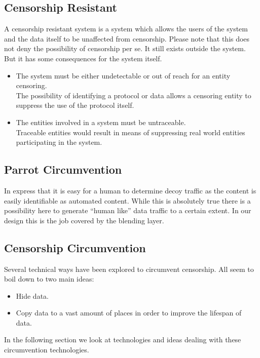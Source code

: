 \subsection{Censorship Resistant}
A censorship resistant system is a system which allows the users of the system and the data itself to be unaffected from censorship. Please note that this does not deny the possibility of censorship per se. It still exists outside the system. But it has some consequences for the system itself.

\begin{itemize}
	\item The system must be either undetectable or out of reach for an entity censoring.\\
	The possibility of identifying a protocol or data allows a censoring entity to suppress the use of the protocol itself. 
	\item The entities involved in a system must be untraceable.\\
	Traceable entities would result in means of suppressing real world entities participating in the system.
\end{itemize}

\subsection{Parrot Circumvention}
In \cite{oakland2013-parrot} \citeauthor{oakland2013-parrot} express that it is easy for a human to determine decoy traffic as the content is easily identifiable as automated content. While this is absolutely true there is a possibility here to generate ``human like'' data traffic to a certain extent. In our design this is the job covered by the blending layer.

\subsection{Censorship Circumvention}
Several technical ways have been explored to circumvent censorship. All seem to boil down to two main ideas:
\begin{itemize}
	\item Hide data.
	\item Copy data to a vast amount of places in order to improve the lifespan of data.
\end{itemize}

In the following section we look at technologies and ideas dealing with these circumvention technologies.

